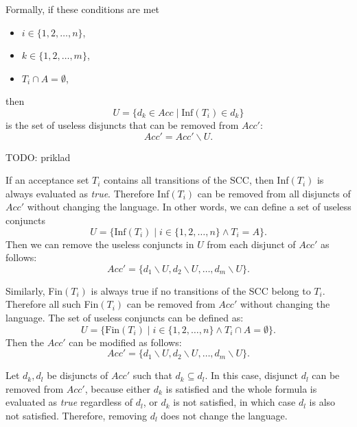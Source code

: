 \documentclass[
  digital, %
  twoside, %
  table,   %
  lof,     %
  lot,     %
]{fithesis3}
\begin{document}
Formally, if these conditions are met
\begin{itemize}
  \item $i \in \{1,2, \dots, n\}$,
  \item $k\in \{1,2, \dots, m\}$,
  \item $T_i \cap A = \emptyset$,
\end{itemize}
then 
\begin{equation*}
  U = \{d_k \in Acc \mid \text{Inf}(T_i) \in d_k \}
\end{equation*}
is the set of useless disjuncts that can be removed from $Acc'$:
\begin{equation*}
  Acc' = Acc' \smallsetminus U.
\end{equation*}

TODO: priklad

If an acceptance set $T_i$ contains all transitions of the SCC, then Inf$(T_i)$ is always evaluated as \emph{true}. Therefore Inf$(T_i)$ can be removed from all disjuncts of $Acc'$ without changing the language. 
In other words, we can define a set of useless conjuncts 
\begin{equation*}
  U = \{\text{Inf}(T_i) \mid i \in \{1,2, \dots, n\} \wedge T_i = A\}.
\end{equation*}
Then we can remove the useless conjuncts in $U$ from each disjunct of $Acc'$ as follows:
\begin{equation*}
  Acc' = \{d_1 \smallsetminus U, d_2 \smallsetminus U, \dots, d_m \smallsetminus U\}.
\end{equation*}

Similarly, Fin$(T_i)$ is always true if no transitions of the SCC belong to $T_i$. Therefore all such Fin$(T_i)$ can be removed from $Acc'$ without changing the language.
The set of useless conjuncts can be defined as:
\begin{equation*}
  U = \{\text{Fin}(T_i) \mid i \in \{1,2, \dots, n\} \wedge T_i \cap A = \emptyset\}.
\end{equation*}
Then the $Acc'$ can be modified as follows:
\begin{equation*}
  Acc' = \{d_1 \smallsetminus U, d_2 \smallsetminus U, \dots, d_m \smallsetminus U\}.
\end{equation*}

Let $d_k, d_l$ be disjuncts of $Acc'$ such that $d_k \subseteq d_l$. In this case, disjunct $d_l$ can be removed from $Acc'$, because either $d_k$ is satisfied and the whole formula is evaluated as \emph{true} regardless of $d_l$, or $d_k$ is not satisfied, in which case $d_l$ is also not satisfied. Therefore, removing $d_l$ does not change the language.
\end{document}
